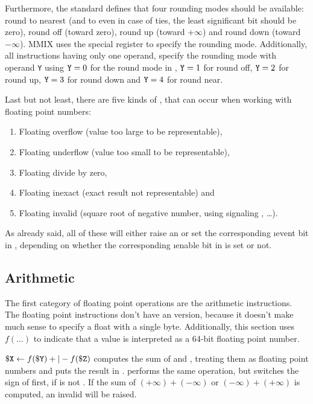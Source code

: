 Furthermore, the standard defines that four rounding modes should be available: round to nearest (and to even in case of ties, \ie the least significant bit should be zero), round off (toward zero), round up (toward $+\infty$) and round down (toward $-\infty$). MMIX uses the special register  to specify the rounding mode. Additionally, all instructions having only one operand, specify the rounding mode with operand {\tt Y} using ${\tt Y}=0$ for the round mode in , ${\tt Y}=1$ for round off, ${\tt Y}=2$ for round up, ${\tt Y}=3$ for round down and ${\tt Y}=4$ for round near. \citep[pg. 15 and 21]{mmix-doc}

Last but not least, there are five kinds of , that can occur when working with floating point numbers:
\begin{enumerate}
	\item Floating overflow (value too large to be representable),
	\item Floating underflow (value too small to be representable),
	\item Floating divide by zero,
	\item Floating inexact (exact result not representable) and
	\item Floating invalid (square root of negative number, using signaling \NaN, \dots).
\end{enumerate}
As already said, all of these will either raise an  or set the corresponding \i{event bit} in , depending on whether the corresponding \i{enable bit} in  is set or not. \citep[pg. 15]{mmix-doc}

\subsection{Arithmetic}

The first category of floating point operations are the arithmetic instructions. The floating point instructions don't have an  version, because it doesn't make much sense to specify a float with a single byte. Additionally, this section uses $f(\dots)$ to indicate that a value is interpreted as a 64-bit floating point number.

\instrtbl
	{}
	{${\tt \$X} \leftarrow f({\tt \$Y}) +|- f({\tt \$Z})$}
\noindent {} computes the sum of  and , treating them as floating point numbers and puts the result in .  performs the same operation, but switches the sign of  first, if  is not \NaN. If the sum of $(+\infty)+(-\infty)$ or $(-\infty)+(+\infty)$ is computed, an invalid  will be raised. \citep[pg. 16]{mmix-doc}

